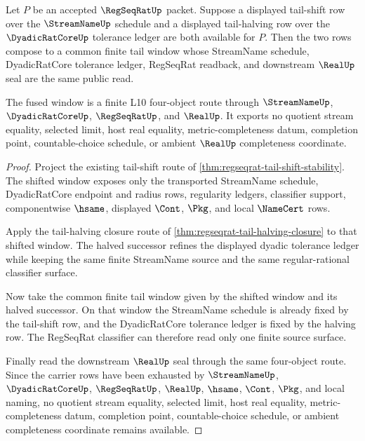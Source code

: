 \begin{theorem}
\label{thm:regseqrat-tail-halving-shift-fusion}
Let $P$ be an accepted $\RegSeqRatUp$ packet. Suppose a displayed tail-shift row over the $\StreamNameUp$ schedule and a displayed tail-halving row over the $\DyadicRatCoreUp$ tolerance ledger are both available for $P$. Then the two rows compose to a common finite tail window whose StreamName schedule, DyadicRatCore tolerance ledger, RegSeqRat readback, and downstream $\RealUp$ seal are the same public read.

The fused window is a finite L10 four-object route through $\StreamNameUp$, $\DyadicRatCoreUp$, $\RegSeqRatUp$, and $\RealUp$. It exports no quotient stream equality, selected limit, host real equality, metric-completeness datum, completion point, countable-choice schedule, or ambient $\RealUp$ completeness coordinate.
\end{theorem}
\begin{proof}
Project the existing tail-shift route of \autoref{thm:regseqrat-tail-shift-stability}. The shifted window exposes only the transported StreamName schedule, DyadicRatCore endpoint and radius rows, regularity ledgers, classifier support, componentwise $\hsame$, displayed $\Cont$, $\Pkg$, and local $\NameCert$ rows.

Apply the tail-halving closure route of \autoref{thm:regseqrat-tail-halving-closure} to that shifted window. The halved successor refines the displayed dyadic tolerance ledger while keeping the same finite StreamName source and the same regular-rational classifier surface.

Now take the common finite tail window given by the shifted window and its halved successor. On that window the StreamName schedule is already fixed by the tail-shift row, and the DyadicRatCore tolerance ledger is fixed by the halving row. The RegSeqRat classifier can therefore read only one finite source surface.

Finally read the downstream $\RealUp$ seal through the same four-object route. Since the carrier rows have been exhausted by $\StreamNameUp$, $\DyadicRatCoreUp$, $\RegSeqRatUp$, $\RealUp$, $\hsame$, $\Cont$, $\Pkg$, and local naming, no quotient stream equality, selected limit, host real equality, metric-completeness datum, completion point, countable-choice schedule, or ambient completeness coordinate remains available.
\end{proof}

